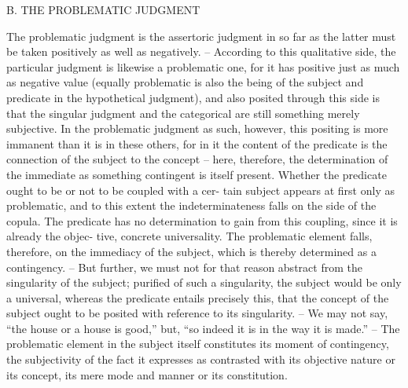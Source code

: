 B. THE PROBLEMATIC JUDGMENT

The problematic judgment is the assertoric judgment in so far as the latter
must be taken positively as well as negatively. – According to this qualitative
side, the particular judgment is likewise a problematic one, for it has
positive just as much as negative value (equally problematic is also the
being of the subject and predicate in the hypothetical judgment), and also
posited through this side is that the singular judgment and the categorical
are still something merely subjective. In the problematic judgment as such,
however, this positing is more immanent than it is in these others, for in
it the content of the predicate is the connection of the subject to the concept –
here, therefore, the determination of the immediate as something contingent
is itself present.
Whether the predicate ought to be or not to be coupled with a cer-
tain subject appears at first only as problematic, and to this extent the
indeterminateness falls on the side of the copula. The predicate has no
determination to gain from this coupling, since it is already the objec-
tive, concrete universality. The problematic element falls, therefore, on the
immediacy of the subject, which is thereby determined as a contingency. –
But further, we must not for that reason abstract from the singularity of
the subject; purified of such a singularity, the subject would be only a
universal, whereas the predicate entails precisely this, that the concept of
the subject ought to be posited with reference to its singularity. – We may
not say, “the house or a house is good,” but, “so indeed it is in the way
it is made.” – The problematic element in the subject itself constitutes its
moment of contingency, the subjectivity of the fact it expresses as contrasted
with its objective nature or its concept, its mere mode and manner or its
constitution.

